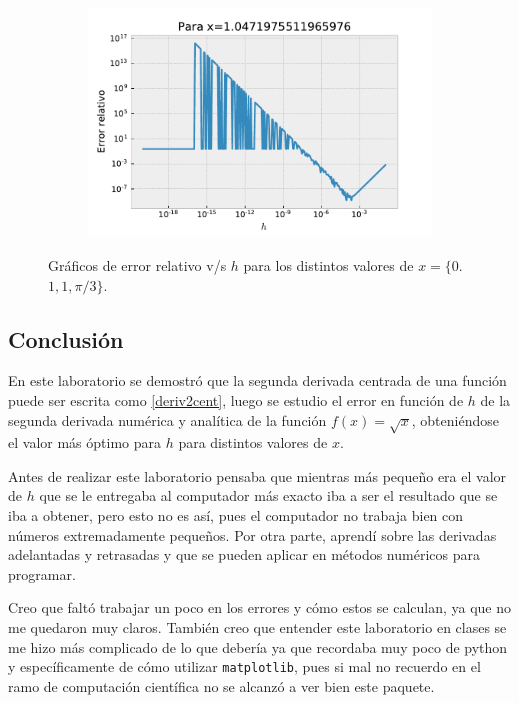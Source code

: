 \documentclass[../portafolio.tex]{subfiles}
\begin{document}
\begin{figure}[H]
\begin{subfigure}[b]{0.3\textwidth}
        \caption{}
        \label{graf2d}
    \end{subfigure}
    \hfill
    \begin{subfigure}[b]{0.3\textwidth}
         \centering
         \includegraphics[width=\textwidth]{tex/img/graf1_0471975511965976_deriv.pdf}
         \caption{}
         \label{graf3d}
     \end{subfigure}
    \caption{Gráficos de error relativo v/s $h$ para los distintos valores de $x=\{ 0$.$1 , 1, \pi/3   \}$.}
    \label{graf123d}
\end{figure}

\subsection{Conclusión}
En este laboratorio se demostró que la segunda derivada centrada de una función puede ser escrita como \ref{deriv2cent}, luego se estudio el error en función de $h$ de la segunda derivada numérica y analítica de la función $f(x)= \sqrt{x}$, obteniéndose el valor más óptimo para $h$ para distintos valores de $x$. 

\vspace{2mm}
Antes de realizar este laboratorio pensaba que mientras más pequeño era el valor de $h$ que se le entregaba al computador más exacto iba a ser el resultado que se iba a obtener, pero esto no es así, pues el computador no trabaja bien con números extremadamente pequeños.
Por otra parte, aprendí sobre las derivadas adelantadas y retrasadas y que se pueden aplicar en métodos numéricos para programar.

\vspace{2mm}
Creo que faltó trabajar un poco en los errores y cómo estos se calculan, ya que no me quedaron muy claros. También creo que entender este laboratorio en clases se me hizo más complicado de lo que debería ya que recordaba muy poco de python y específicamente de cómo utilizar \texttt{matplotlib}, pues si mal no recuerdo en el ramo de computación científica no se alcanzó a ver bien este paquete.
\end{document}
